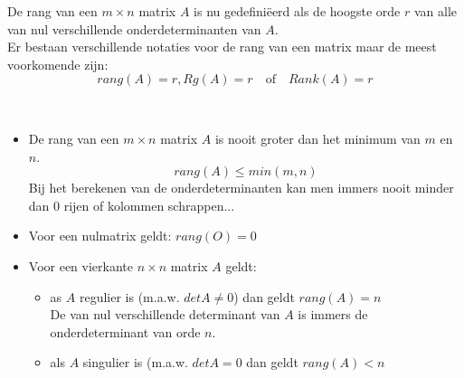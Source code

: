 De rang van een $m \times n$ matrix $A$ is nu gedefini\"{e}erd als de hoogste orde $r$ van alle van nul verschillende onderdeterminanten van $A$.\\

Er bestaan verschillende notaties voor de rang van een matrix maar de meest voorkomende zijn:\\ 

\[ rang(A)=r, Rg(A)=r  \quad \textrm{of} \quad Rank(A)=r \]


\begin{opmerking}
	\ \\
	\begin{itemize}
	\item De rang van een $m \times n$ matrix $A$ is nooit groter dan het minimum van $m$ en $n$. 
	\[ rang(A) \leq min(m,n)  \]
	Bij het berekenen van de onderdeterminanten kan men immers nooit minder dan $0$ rijen of kolommen schrappen...
	\item Voor een nulmatrix geldt: $rang(O)=0$
	\item Voor een vierkante $n \times n$ matrix $A$ geldt:
		\begin{itemize}
			\item as $A$ regulier is (m.a.w. $det A \neq 0$) dan geldt $rang(A)=n$\\
			De van nul verschillende determinant van $A$ is immers de onderdeterminant van orde $n$.
			\item als $A$ singulier is (m.a.w. $det A =0$ dan geldt $rang(A)<n$
		\end{itemize}
\end{itemize}

\end{opmerking}


